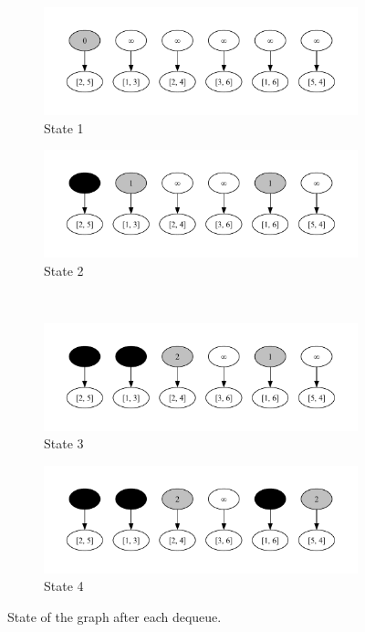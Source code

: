 \begin{figure}
	\centering
	\begin{subfigure}{0.45\textwidth}
		\centering
		\includegraphics[width=\linewidth]{photos/diagrams/graphs/graph_state_1.pdf}
		\caption{State 1}
	\end{subfigure}
	\hfill
	\begin{subfigure}{0.45\textwidth}
		\centering
		\includegraphics[width=\linewidth]{photos/diagrams/graphs/graph_state_2.pdf}
		\caption{State 2}
	\end{subfigure}
	\\
	\begin{subfigure}{0.45\textwidth}
		\centering
		\includegraphics[width=\linewidth]{photos/diagrams/graphs/graph_state_3.pdf}
		\caption{State 3}
	\end{subfigure}
	\hfill
	\begin{subfigure}{0.45\textwidth}
		\centering
		\includegraphics[width=\linewidth]{photos/diagrams/graphs/graph_state_4.pdf}
		\caption{State 4}
	\end{subfigure}
	\caption{State of the graph after each dequeue.}
\end{figure}
